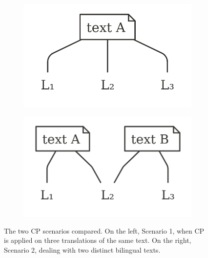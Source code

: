 \begin{figure}[h]
    \centering
    \begin{subfigure}{.5\textwidth}
      \centering
      \includegraphics[width=.7\linewidth]{figure/scen1.png}
    \end{subfigure}%
    \begin{subfigure}{.5\textwidth}
        \centering
        \includegraphics[width=.7\linewidth]{figure/scen2.png}
    \end{subfigure}
    \caption[The two CP scenarios compared]{The two CP scenarios compared. On the left, Scenario 1, when CP is applied on three translations of the same text. On the right, Scenario 2, dealing with two distinct bilingual texts.}
    \label{scens}
\end{figure}

